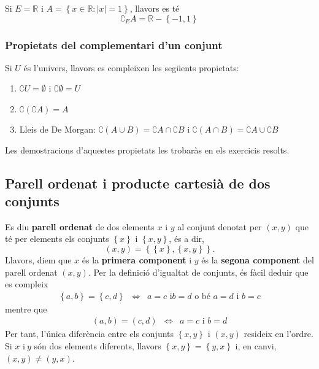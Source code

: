 \begin{exem}
Si $E=\mathbb{R}$ i $A=\left\{ x\in\mathbb{R}:\left\vert x\right\vert
=1\right\} $, llavors es t\'{e}%
\begin{equation*}
\complement_{E}A=\mathbb{R}-\left\{ -1,1\right\}
\end{equation*}
\end{exem}

\subsubsection{Propietats del complementari d'un conjunt}

Si $U$ \'{e}s l'univers, llavors es compleixen les seg\"{u}ents propietats:

\begin{enumerate}
\item $\complement U=\emptyset$ i $\complement\emptyset=U$

\item $\complement\left( \complement A\right) =A$

\item Lleis de De Morgan: $\complement\left( A\cup B\right) =\complement
A\cap\complement B$ i $\complement\left( A\cap B\right) =\complement
A\cup\complement B$
\end{enumerate}

Les demostracions d'aquestes propietats les trobar\`{a}s en els exercicis
resolts.

\subsection{Parell ordenat i producte cartesi\`{a} de dos conjunts}

Es diu \textbf{parell ordenat} de dos elements $x$ i $y$ al conjunt denotat
per $(x,y)$ que t\'{e} per elements els conjunts $\left\{ x\right\} $ i $%
\left\{ x,y\right\} $, \'{e}s a dir,%
\begin{equation*}
(x,y)=\left\{ \left\{ x\right\} ,\left\{ x,y\right\} \right\} \text{.}
\end{equation*}
Llavors, diem que $x$ \'{e}s la \textbf{primera component} i $y$ \'{e}s la
\textbf{segona component} del parell ordenat $(x,y)$. Per la definici\'{o}
d'igualtat de conjunts, \'{e}s f\`{a}cil deduir que es compleix%
\begin{equation*}
\begin{array}{ccc}
\left\{ a,b\right\} =\left\{ c,d\right\} & \Longleftrightarrow & a=c\text{ i
}b=d\text{ o b\'{e} }a=d\text{ i }b=c%
\end{array}
\end{equation*}
mentre que%
\begin{equation*}
\begin{array}{ccc}
(a,b)=(c,d) & \Longleftrightarrow & a=c\text{ i }b=d%
\end{array}
\end{equation*}
Per tant, l'\'{u}nica difer\`{e}ncia entre els conjunts $\left\{ x,y\right\}
$ i $(x,y)$ resideix en l'ordre. Si $x$ i$\ y$ s\'{o}n dos elements
diferents, llavors $\left\{ x,y\right\} =\left\{ y,x\right\} $ i, en canvi, $%
(x,y)\neq(y,x)$.

